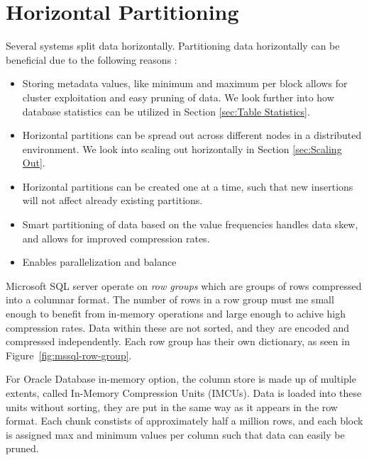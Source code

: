 \section{Horizontal Partitioning}
\label{sec:Horizontal Partitioning}
Several systems split data horizontally. Partitioning data horizontally can be beneficial due to the following reasons :
\begin{itemize}
  \item Storing metadata values, like minimum and maximum per block allows for cluster exploitation and easy pruning of data. We look further into how database statistics can be utilized in Section \ref{sec:Table Statistics}.
  \item Horizontal partitions can be spread out across different nodes in a distributed environment. We look into scaling out horizontally in Section \ref{sec:Scaling Out}.
  \item Horizontal partitions can be created one at a time, such that new insertions will not affect already existing partitions.
  \item Smart partitioning of data based on the value frequencies handles data skew, and allows for improved compression rates.
  \item Enables parallelization and balance \cite{Exasol2014-xh}
\end{itemize}

Microsoft SQL server operate on \textit{row groups} which are groups of rows compressed into a columnar format. The number of rows in a row group must me small enough to benefit from in-memory operations and large enough to achive high compression rates. Data within these are not sorted, and they are encoded and compressed independently. Each row group has their own dictionary, as seen in Figure~\ref{fig:mssql-row-group}.

For Oracle Database in-memory option, the column store is made up of multiple extents, called In-Memory Compression Units (IMCUs). Data is loaded into these units without sorting, they are put in the same way as it appears in the row format. Each chunk constists of approximately half a million rows, and each block is assigned max and minimum values per column such that data can easily be pruned.

